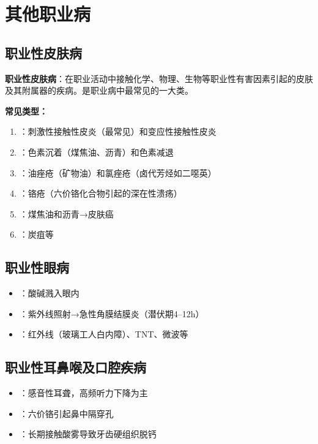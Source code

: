 \chapter{其他职业病}
\setcounter{chapter}{8}

\section{职业性皮肤病}

\begin{defbox}
\textbf{职业性皮肤病}：在职业活动中接触化学、物理、生物等职业性有害因素引起的皮肤及其附属器的疾病。是职业病中最常见的一大类。

\textbf{常见类型：}
\begin{enumerate}[leftmargin=*]
    \item {}：刺激性接触性皮炎（最常见）和变应性接触性皮炎
    \item {}：色素沉着（煤焦油、沥青）和色素减退
    \item {}：油痤疮（矿物油）和氯痤疮（卤代芳烃如二噁英）
    \item {}：铬疮（六价铬化合物引起的深在性溃疡）
    \item {}：煤焦油和沥青→皮肤癌
    \item {}：炭疽等
\end{enumerate}
\end{defbox}

\section{职业性眼病}

\begin{itemize}[leftmargin=*]
    \item {}：酸碱溅入眼内
    \item {}：紫外线照射→急性角膜结膜炎（潜伏期4--12h）
    \item {}：红外线（玻璃工人白内障）、TNT、微波等
\end{itemize}

\section{职业性耳鼻喉及口腔疾病}

\begin{itemize}[leftmargin=*]
    \item {}：感音性耳聋，高频听力下降为主
    \item {}：六价铬引起鼻中隔穿孔
    \item {}：长期接触酸雾导致牙齿硬组织脱钙
\end{itemize}

\newpage

\newpage